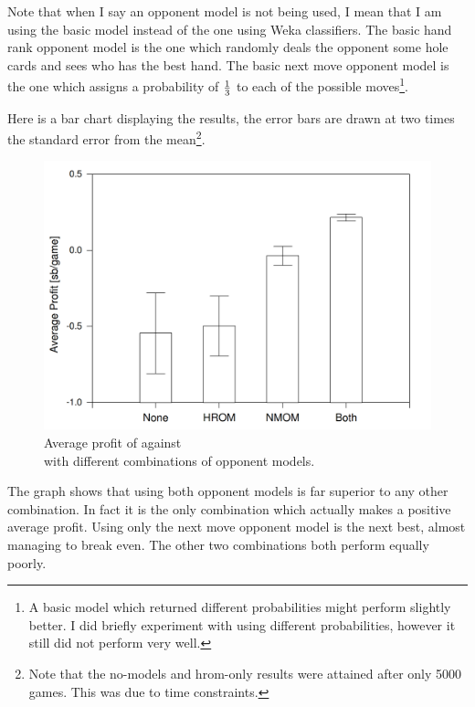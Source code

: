 Note that when I say an opponent model is not being used, I mean that I am using the basic model instead of the one using Weka classifiers. The basic hand rank opponent model is the one which randomly deals the opponent some hole cards and sees who has the best hand. The basic next move opponent model is the one which assigns a probability of \(1 \over 3\) to each of the possible moves\footnote{A basic model which returned different probabilities might perform slightly better. I did briefly experiment with using different probabilities, however it still did not perform very well.}.


Here is a bar chart displaying the results, the error bars are drawn at two times the standard error from the mean\footnote{Note that the no-models and hrom-only results were attained after only 5000 games. This was due to time constraints.}.
\begin{figure}[H]
\centering
\includegraphics[width=144mm]{Graphs/SBvMB-oppmodels-v2.png}
\caption{Average profit of \mbt against \sbt \\ with different combinations of opponent models.}
\end{figure}

The graph shows that using both opponent models is far superior to any other combination. In fact it is the only combination which actually makes a positive average profit.
Using only the next move opponent model is the next best, almost managing to break even. The other two combinations both perform equally poorly.


